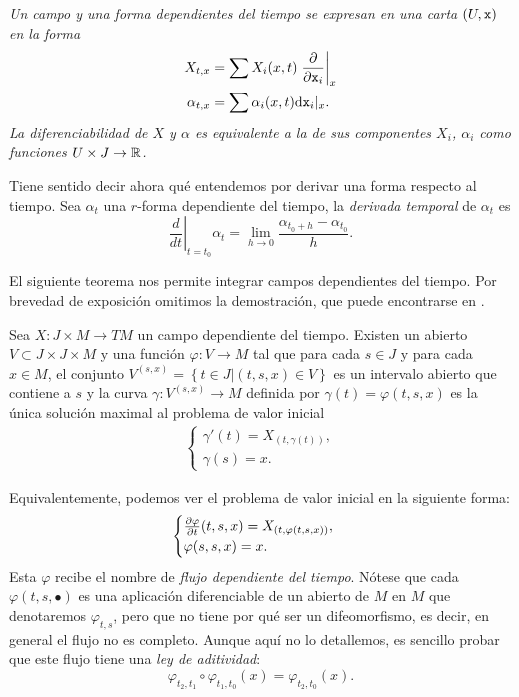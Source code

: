   \begin{obs}
    \em
    Un campo y una forma dependientes del tiempo se expresan en una carta $(U,\mathtt{x})$ en la forma
    \begin{align*}
      X_{t,x} &= \sum X_i(x,t) \left.\frac{\partial}{\partial \mathtt{x}_i}\right|_x \\
      \alpha_{t,x} &= \sum \alpha_i(x,t) \mathrm{d} \mathtt{x}_i |_x.
    \end{align*}
    La diferenciabilidad de $X$ y $\alpha$ es equivalente a la de sus componentes $X_i$, $\alpha_i$ como funciones $U\times J \rightarrow \mathbb{R}$.
  \end{obs}
  Tiene sentido decir ahora qué entendemos por derivar una forma respecto al tiempo. Sea $\alpha_t$ una $r$-forma dependiente del tiempo, la \emph{derivada temporal} de $\alpha_t$ es
    \begin{equation*}
      \left. \frac{d}{dt}\right|_{t=t_0} \alpha_t = \lim_{h\rightarrow 0}\frac{\alpha_{t_0+h}-\alpha_{t_0}}{h}.
    \end{equation*}

    El siguiente teorema nos permite integrar campos dependientes del tiempo. Por brevedad de exposición omitimos la demostración, que puede encontrarse en \cite{lee}.
  \begin{thm}
    Sea $X:J\times M \rightarrow TM$ un campo dependiente del tiempo. Existen un abierto $V\subset J\times J\times M$ y una función $\varphi:V\rightarrow M$ tal que para cada $s\in J$ y para cada $x\in M$, el conjunto $V^{(s,x)}=\left\{ t\in J | (t,s,x) \in V \right\}$ es un intervalo abierto que contiene a $s$ y la curva $\gamma:V^{(s,x)}\rightarrow M$ definida por $\gamma(t)=\varphi(t,s,x)$ es la única solución maximal al problema de valor inicial
    \begin{align*}
      \begin{cases}
      \gamma'(t)=X_{(t,\gamma(t))}, \\
      \gamma(s)=x.
    \end{cases}
    \end{align*}
  \end{thm}
    Equivalentemente, podemos ver el problema de valor inicial en la siguiente forma:
    \begin{align*}
      \begin{cases}
      \frac{\partial \varphi}{\partial t}(t,s,x)=X_{(t,\varphi(t,s,x))}, \\
      \varphi(s,s,x)=x.
    \end{cases}
    \end{align*}
    Esta $\varphi$ recibe el nombre de \emph{flujo dependiente del tiempo}. Nótese que cada $\varphi(t,s,\bullet)$ es una aplicación diferenciable de un abierto de $M$ en $M$ que denotaremos $\varphi_{t,s}$, pero que no tiene por qué ser un difeomorfismo, es decir, en general el flujo no es completo. Aunque aquí no lo detallemos, es sencillo probar que este flujo tiene una \emph{ley de aditividad}:
    \begin{equation*}
      \varphi_{t_2,t_1}\circ \varphi_{t_1,t_0}(x)=\varphi_{t_2,t_0}(x).
    \end{equation*}

